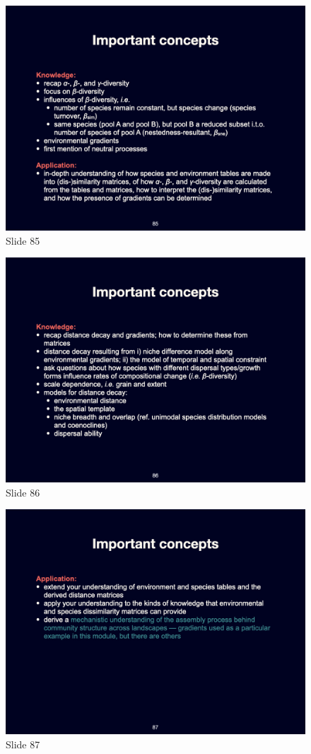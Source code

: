 \documentclass[
  10pt,
]{book}
\begin{document}
\begin{figure}[ht]
\centering
\includegraphics[width=0.8\linewidth]{../images/BDC334/BDC334-085.jpeg}
\caption*{Slide 85}
\end{figure}

\begin{figure}[ht]
\centering
\includegraphics[width=0.8\linewidth]{../images/BDC334/BDC334-086.jpeg}
\caption*{Slide 86}
\end{figure}

\begin{figure}[ht]
\centering
\includegraphics[width=0.8\linewidth]{../images/BDC334/BDC334-087.jpeg}
\caption*{Slide 87}
\end{figure}
\end{document}
